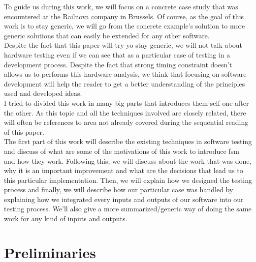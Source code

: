 \documentclass[12pt]{article}
\begin{document}
To guide us during this work, we will focus on a concrete case study that was encountered at the Railnova company in Brussels. Of course, as the goal of this work is to stay generic, we will go from the concrete example's solution to more generic solutions that can easily be extended for any other software.\\

Despite the fact that this paper will try yo stay generic, we will not talk about hardware testing even if we can see that as a particular case of testing in a development process. Despite the fact that strong timing constraint doesn't allows us to performs this hardware analysis, we think that focusing on software development will help the reader to get a better understanding of the principles used and developed ideas.\\

I tried to divided this work in many big parts that introduces them-self one after the other. As this topic and all the techniques involved are closely related, there will often be references to area not already covered during the sequential reading of this paper.\\

The first part of this work will describe the existing techniques in software testing and discuss of what are some of the motivations of this work to introduce \gls{fsm} and how they work. Following this, we will discuss about the work that was done, why it is an important improvement and what are the decisions that lead us to this particular implementation. Then, we will explain how we designed the testing process and finally, we will describe how our particular case was handled by explaining how we integrated every inputs and outputs of our software into our testing process. We'll also give a more summarized/generic way of doing the same work for any kind of inputs and outputs.



\clearpage
\part{Preliminaries}
\end{document}
